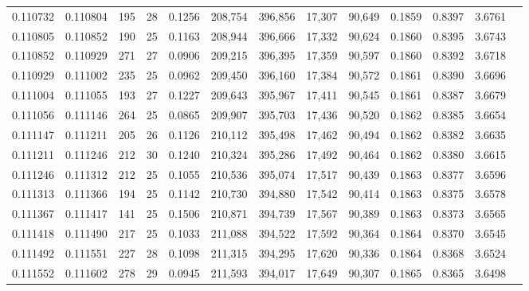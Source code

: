 \begin{tabular}{rrrrrrrrrrrrr}
0.110732 & 0.110804 & 195 &  28 &                                     0.1256 & 208,754 & 396,856 &  17,307 &  90,649 & 0.1859 & 0.8397 & 3.6761 \\
0.110805 & 0.110852 & 190 &  25 &                                     0.1163 & 208,944 & 396,666 &  17,332 &  90,624 & 0.1860 & 0.8395 & 3.6743 \\
0.110852 & 0.110929 & 271 &  27 &                                     0.0906 & 209,215 & 396,395 &  17,359 &  90,597 & 0.1860 & 0.8392 & 3.6718 \\
0.110929 & 0.111002 & 235 &  25 &                                     0.0962 & 209,450 & 396,160 &  17,384 &  90,572 & 0.1861 & 0.8390 & 3.6696 \\
0.111004 & 0.111055 & 193 &  27 &                                     0.1227 & 209,643 & 395,967 &  17,411 &  90,545 & 0.1861 & 0.8387 & 3.6679 \\
0.111056 & 0.111146 & 264 &  25 &                                     0.0865 & 209,907 & 395,703 &  17,436 &  90,520 & 0.1862 & 0.8385 & 3.6654 \\
0.111147 & 0.111211 & 205 &  26 &                                     0.1126 & 210,112 & 395,498 &  17,462 &  90,494 & 0.1862 & 0.8382 & 3.6635 \\
0.111211 & 0.111246 & 212 &  30 &                                     0.1240 & 210,324 & 395,286 &  17,492 &  90,464 & 0.1862 & 0.8380 & 3.6615 \\
0.111246 & 0.111312 & 212 &  25 &                                     0.1055 & 210,536 & 395,074 &  17,517 &  90,439 & 0.1863 & 0.8377 & 3.6596 \\
0.111313 & 0.111366 & 194 &  25 &                                     0.1142 & 210,730 & 394,880 &  17,542 &  90,414 & 0.1863 & 0.8375 & 3.6578 \\
0.111367 & 0.111417 & 141 &  25 &                                     0.1506 & 210,871 & 394,739 &  17,567 &  90,389 & 0.1863 & 0.8373 & 3.6565 \\
0.111418 & 0.111490 & 217 &  25 &                                     0.1033 & 211,088 & 394,522 &  17,592 &  90,364 & 0.1864 & 0.8370 & 3.6545 \\
0.111492 & 0.111551 & 227 &  28 &                                     0.1098 & 211,315 & 394,295 &  17,620 &  90,336 & 0.1864 & 0.8368 & 3.6524 \\
0.111552 & 0.111602 & 278 &  29 &                                     0.0945 & 211,593 & 394,017 &  17,649 &  90,307 & 0.1865 & 0.8365 & 3.6498 \\

\end{tabular}
